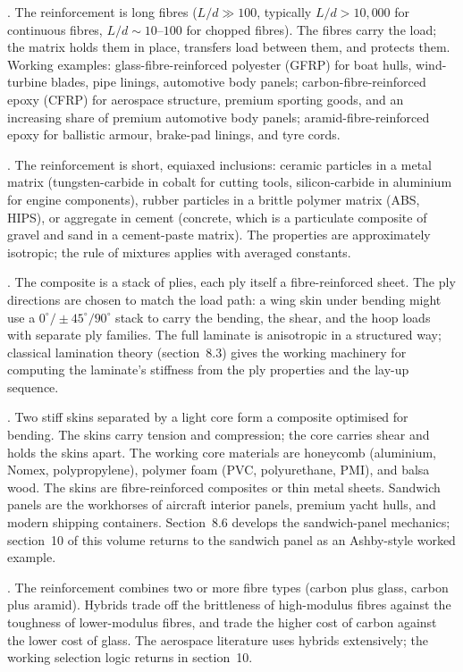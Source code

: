 . The reinforcement is long
fibres ($L/d \gg 100$, typically $L/d > 10{,}000$ for continuous fibres,
$L/d \sim 10$--$100$ for chopped fibres). The fibres carry the load;
the matrix holds them in place, transfers load between them, and
protects them. Working examples: glass-fibre-reinforced polyester
(GFRP) for boat hulls, wind-turbine blades, pipe linings, automotive
body panels; carbon-fibre-reinforced epoxy (CFRP) for aerospace
structure, premium sporting goods, and an increasing share of premium
automotive body panels; aramid-fibre-reinforced epoxy for ballistic
armour, brake-pad linings, and tyre cords.

. The reinforcement is short, equiaxed
inclusions: ceramic particles in a metal matrix (tungsten-carbide in
cobalt for cutting tools, silicon-carbide in aluminium for engine
components), rubber particles in a brittle polymer matrix (ABS, HIPS),
or aggregate in cement (concrete, which is a particulate composite of
gravel and sand in a cement-paste matrix). The properties are
approximately isotropic; the rule of mixtures applies with averaged
constants.

. The composite is a stack of plies, each
ply itself a fibre-reinforced sheet. The ply directions are chosen to
match the load path: a wing skin under bending might use a $0^\circ /
\pm 45^\circ / 90^\circ$ stack to carry the bending, the shear, and the
hoop loads with separate ply families. The full laminate is anisotropic
in a structured way; classical lamination theory (section~8.3) gives
the working machinery for computing the laminate's stiffness from the
ply properties and the lay-up sequence.

. Two stiff skins separated by a light
core form a composite optimised for bending. The skins carry tension
and compression; the core carries shear and holds the skins apart. The
working core materials are honeycomb (aluminium, Nomex, polypropylene),
polymer foam (PVC, polyurethane, PMI), and balsa wood. The skins are
fibre-reinforced composites or thin metal sheets. Sandwich panels are
the workhorses of aircraft interior panels, premium yacht hulls, and
modern shipping containers. Section~8.6 develops the sandwich-panel
mechanics; section~10 of this volume returns to the sandwich panel as
an Ashby-style worked example.

. The reinforcement combines two or more
fibre types (carbon plus glass, carbon plus aramid). Hybrids trade off
the brittleness of high-modulus fibres against the toughness of
lower-modulus fibres, and trade the higher cost of carbon against the
lower cost of glass. The aerospace literature uses hybrids
extensively; the working selection logic returns in section~10.

